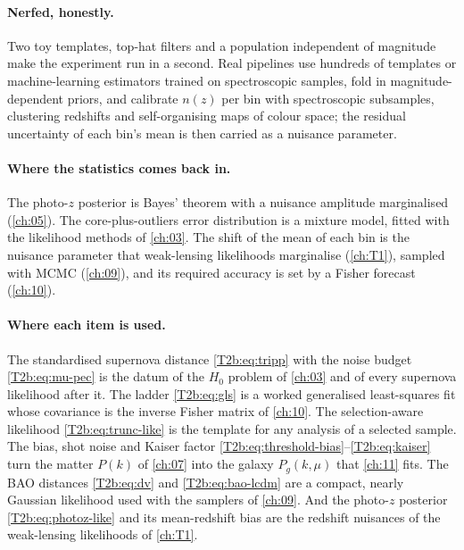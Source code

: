 \paragraph{Nerfed, honestly.} Two toy templates, top-hat filters and a population independent of magnitude make the experiment run in a second. Real pipelines use hundreds of templates or machine-learning estimators trained on spectroscopic samples, fold in magnitude-dependent priors, and calibrate $n(z)$ per bin with spectroscopic subsamples, clustering redshifts and self-organising maps of colour space; the residual uncertainty of each bin's mean is then carried as a nuisance parameter.

\paragraph{Where the statistics comes back in.} The photo-$z$ posterior is Bayes' theorem with a nuisance amplitude marginalised (\cref{ch:05}). The core-plus-outliers error distribution is a mixture model, fitted with the likelihood methods of \cref{ch:03}. The shift of the mean of each bin is the nuisance parameter that weak-lensing likelihoods marginalise (\cref{ch:T1}), sampled with MCMC (\cref{ch:09}), and its required accuracy is set by a Fisher forecast (\cref{ch:10}).
\paragraph{Where each item is used.}
The standardised supernova distance \eqref{T2b:eq:tripp} with the noise budget \eqref{T2b:eq:mu-pec} is the datum of the $H_0$ problem of \cref{ch:03} and of every supernova likelihood after it. The ladder \eqref{T2b:eq:gls} is a worked generalised least-squares fit whose covariance is the inverse Fisher matrix of \cref{ch:10}. The selection-aware likelihood \eqref{T2b:eq:trunc-like} is the template for any analysis of a selected sample. The bias, shot noise and Kaiser factor \eqref{T2b:eq:threshold-bias}--\eqref{T2b:eq:kaiser} turn the matter $P(k)$ of \cref{ch:07} into the galaxy $P_g(k,\mu)$ that \cref{ch:11} fits. The BAO distances \eqref{T2b:eq:dv} and \eqref{T2b:eq:bao-lcdm} are a compact, nearly Gaussian likelihood used with the samplers of \cref{ch:09}. And the photo-$z$ posterior \eqref{T2b:eq:photoz-like} and its mean-redshift bias are the redshift nuisances of the weak-lensing likelihoods of \cref{ch:T1}.

